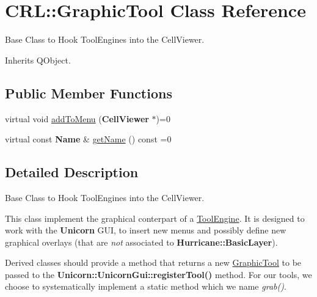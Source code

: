 \hypertarget{classCRL_1_1GraphicTool}{\section{C\-R\-L\-:\-:Graphic\-Tool Class Reference}
\label{classCRL_1_1GraphicTool}
}


Base Class to Hook Tool\-Engines into the Cell\-Viewer.  




Inherits Q\-Object.

\subsection*{Public Member Functions}
\begin{DoxyCompactItemize}
\item 
virtual void \hyperlink{classCRL_1_1GraphicTool_a63941f6c930c08087935ea3e276ee9a9}{add\-To\-Menu} ({\bf Cell\-Viewer} $\ast$)=0
\item 
virtual const {\bf Name} \& \hyperlink{classCRL_1_1GraphicTool_a4420ce085389f1f9111735031467848d}{get\-Name} () const =0
\end{DoxyCompactItemize}


\subsection{Detailed Description}
Base Class to Hook Tool\-Engines into the Cell\-Viewer. 

This class implement the graphical conterpart of a \hyperlink{classCRL_1_1ToolEngine}{Tool\-Engine}. It is designed to work with the {\bf Unicorn} G\-U\-I, to insert new menus and possibly define new graphical overlays (that are {\itshape not} associated to {\bf Hurricane\-::\-Basic\-Layer}).

Derived classes should provide a method that returns a new \hyperlink{classCRL_1_1GraphicTool}{Graphic\-Tool} to be passed to the {\bf Unicorn\-::\-Unicorn\-Gui\-::register\-Tool()} method. For our tools, we choose to systematically implement a {\ttfamily static} method which we name {\itshape grab()}. 

